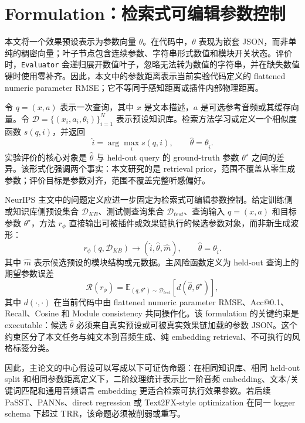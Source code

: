 \chapter{Formulation：检索式可编辑参数控制}
\label{chap:formulation}

本文将一个效果预设表示为参数向量 $\theta$。在代码中，$\theta$ 表现为嵌套 JSON，而非单纯的稠密向量；叶子节点包含连续参数、字符串形式数值和模块开关状态。评价时，\texttt{Evaluator} 会递归展开数值叶子，忽略无法转为数值的字符串，并在缺失数值键时使用零补齐。因此，本文中的参数距离表示当前实验代码定义的 flattened numeric parameter RMSE；它不等同于感知距离或插件内部物理距离。

令 $q=(x,a)$ 表示一次查询，其中 $x$ 是文本描述，$a$ 是可选参考音频或其缓存向量。令 $\mathcal{D}=\{(x_i,a_i,\theta_i)\}_{i=1}^{N}$ 表示预设知识库。检索方法学习或定义一个相似度函数 $s(q,i)$，并返回
\[
	\hat{i}=\arg\max_i s(q,i), \qquad \hat{\theta}=\theta_{\hat{i}}.
\]
实验评价的核心对象是 $\hat{\theta}$ 与 held-out query 的 ground-truth 参数 $\theta^\star$ 之间的差异。该形式化强调两个事实：本文研究的是 retrieval prior，范围不覆盖从零生成参数；评价目标是参数对齐，范围不覆盖完整听感偏好。

NeurIPS 主文中的问题定义应进一步固定为检索式可编辑参数控制。给定训练侧或知识库侧预设集合 $\mathcal{D}_{KB}$、测试侧查询集合 $\mathcal{D}_{test}$、查询输入 $q=(x,a)$ 和目标参数 $\theta^\star$，方法 $r_\phi$ 直接输出可被插件或效果链执行的候选参数对象，而非新生成波形：
\[
	r_\phi(q,\mathcal{D}_{KB}) \rightarrow (\hat{i},\hat{\theta},\hat{m}), \qquad \hat{\theta}=\theta_{\hat{i}}.
\]
其中 $\hat{m}$ 表示候选预设的模块结构或元数据。主风险函数定义为 held-out 查询上的期望参数误差
\[
	\mathcal{R}(r_\phi)=\mathbb{E}_{(q,\theta^\star)\sim\mathcal{D}_{test}}\left[d(\hat{\theta},\theta^\star)\right],
\]
其中 $d(\cdot,\cdot)$ 在当前代码中由 flattened numeric parameter RMSE、Acc@0.1、Recall、Cosine 和 Module consistency 共同操作化。该 formulation 的关键约束是 executable：候选 $\hat{\theta}$ 必须来自真实预设或可被真实效果链加载的参数 JSON。这个约束区分了本文任务与纯文本到音频生成、纯 embedding retrieval、不可执行的风格标签分类。

因此，主论文的中心假设可以写成以下可证伪命题：在相同知识库、相同 held-out split 和相同参数距离定义下，二阶纹理统计表示比一阶音频 embedding、文本/关键词匹配和通用音频语言 embedding 更适合检索可执行效果参数。若后续 PaSST、PANNs、direct regression 或 Text2FX-style optimization 在同一 logger schema 下超过 TRR，该命题必须被削弱或重写。

